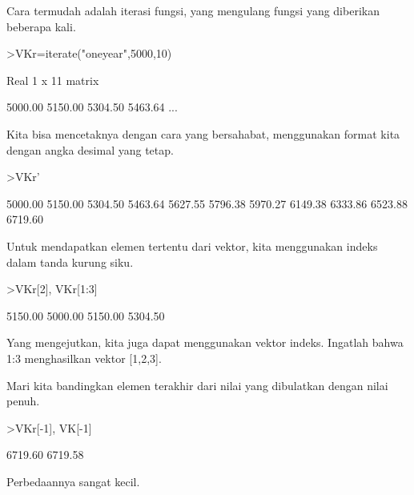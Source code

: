 \documentclass[a4paper,10pt]{article}
\begin{document}
\begin{eulernotebook}
\begin{eulercomment}
\begin{eulercomment}
\begin{eulercomment}
\begin{eulercomment}
\begin{eulercomment}
\begin{eulercomment}
\begin{eulercomment}
Cara termudah adalah iterasi fungsi, yang mengulang fungsi yang
diberikan beberapa kali.
\end{eulercomment}
\begin{eulerprompt}
>VKr=iterate("oneyear",5000,10)
\end{eulerprompt}
\begin{euleroutput}
  Real 1 x 11 matrix
  
      5000.00     5150.00     5304.50     5463.64     ...
\end{euleroutput}
\begin{eulercomment}
Kita bisa mencetaknya dengan cara yang bersahabat, menggunakan format
kita dengan angka desimal yang tetap.
\end{eulercomment}
\begin{eulerprompt}
>VKr'
\end{eulerprompt}
\begin{euleroutput}
      5000.00 
      5150.00 
      5304.50 
      5463.64 
      5627.55 
      5796.38 
      5970.27 
      6149.38 
      6333.86 
      6523.88 
      6719.60 
\end{euleroutput}
\begin{eulercomment}
Untuk mendapatkan elemen tertentu dari vektor, kita menggunakan indeks
dalam tanda kurung siku.
\end{eulercomment}
\begin{eulerprompt}
>VKr[2], VKr[1:3]
\end{eulerprompt}
\begin{euleroutput}
      5150.00 
      5000.00     5150.00     5304.50 
\end{euleroutput}
\begin{eulercomment}
Yang mengejutkan, kita juga dapat menggunakan vektor indeks. Ingatlah
bahwa 1:3 menghasilkan vektor [1,2,3].

Mari kita bandingkan elemen terakhir dari nilai yang dibulatkan dengan
nilai penuh.
\end{eulercomment}
\begin{eulerprompt}
>VKr[-1], VK[-1]
\end{eulerprompt}
\begin{euleroutput}
      6719.60 
      6719.58 
\end{euleroutput}
\begin{eulercomment}
Perbedaannya sangat kecil.


\end{eulercomment}
\end{eulercomment}
\end{eulercomment}
\end{eulercomment}
\end{eulercomment}
\end{eulercomment}
\end{eulercomment}
\end{eulernotebook}
\end{document}
